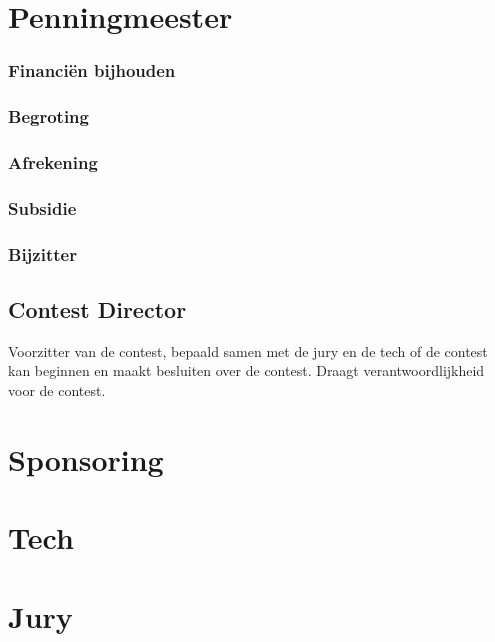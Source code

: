\section{Penningmeester}
	\subsubsection{Financi\"en bijhouden}
	
	\subsubsection{Begroting}
	
	\subsubsection{Afrekening}
	
	\subsubsection{Subsidie}
	
	\subsubsection{Bijzitter}
	
	\subsection{Contest Director}
	Voorzitter van de contest, bepaald samen met de jury en de tech of de contest kan beginnen en maakt besluiten over de contest. Draagt verantwoordlijkheid voor de contest.

\section{Sponsoring\label{Sponsoring}}
	
\section{Tech}

\section{Jury}

